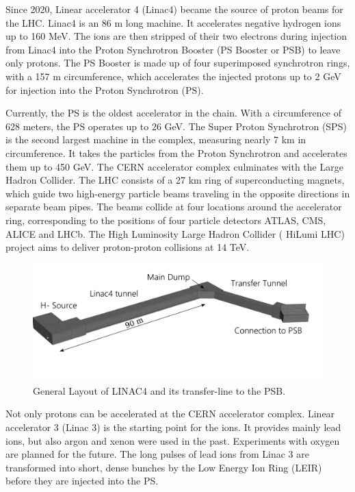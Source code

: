 Since 2020, Linear accelerator 4 (Linac4) became the source of proton beams for the LHC. Linac4 is an 86 \si{\meter} long machine. It accelerates negative hydrogen ions up to 160 \si{\mega \electronvolt}. The ions are then stripped of their two electrons during injection from Linac4 into the Proton Synchrotron Booster (PS Booster or PSB) to leave only protons. The PS Booster is made up of four superimposed synchrotron rings, with a 157 \si{\meter} circumference, which accelerates the injected protons up to 2 GeV for injection into the Proton Synchrotron (PS). 

Currently, the PS is the oldest accelerator in the chain. With a circumference of 628 meters, the PS operates up to 26 \si{\giga \electronvolt}. The Super Proton Synchrotron (SPS) is the second largest machine in the complex, measuring nearly 7 \si{\kilo \meter} in circumference. It takes the particles from the Proton Synchrotron and accelerates them up to 450 \si{\giga \electronvolt}. The CERN accelerator complex culminates with the Large Hadron Collider. The LHC consists of a 27 \si{\kilo \meter} ring of superconducting magnets, which guide two high-energy particle beams traveling in the opposite directions in separate beam pipes. The beams collide at four locations around the accelerator ring, corresponding to the positions of four particle detectors ATLAS, CMS, ALICE and LHCb. The High Luminosity Large Hadron Collider ( HiLumi LHC) project aims to deliver proton-proton collisions at 14 \si{\tera \electronvolt}.

\begin{figure}[h]
    \centering
    \includegraphics[width=0.70\columnwidth]{Linac4_Layout/linac4_Layout.png}
    \caption{General Layout of LINAC4 and its transfer-line to the PSB. }
    \label{fig:Linac4_layout}
\end{figure}

Not only protons can be accelerated at the CERN accelerator complex. Linear accelerator 3 (Linac 3) is the starting point for the ions. It provides mainly lead ions, but also argon and xenon were used in the past. Experiments with oxygen are planned for the future. The long pulses of lead ions from Linac 3 are transformed into short, dense bunches by the Low Energy Ion Ring (LEIR) before they are injected into the PS. 

